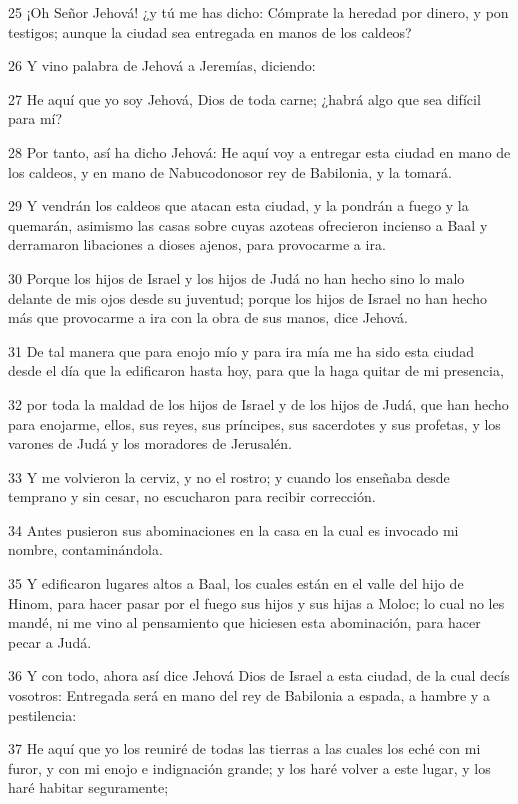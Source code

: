 \par 25 ¡Oh Señor Jehová! ¿y tú me has dicho: Cómprate la heredad por dinero, y pon testigos; aunque la ciudad sea entregada en manos de los caldeos?
\par 26 Y vino palabra de Jehová a Jeremías, diciendo:
\par 27 He aquí que yo soy Jehová, Dios de toda carne; ¿habrá algo que sea difícil para mí?
\par 28 Por tanto, así ha dicho Jehová: He aquí voy a entregar esta ciudad en mano de los caldeos, y en mano de Nabucodonosor rey de Babilonia, y la tomará. 
\par 29 Y vendrán los caldeos que atacan esta ciudad, y la pondrán a fuego y la quemarán, asimismo las casas sobre cuyas azoteas ofrecieron incienso a Baal y derramaron libaciones a dioses ajenos, para provocarme a ira.
\par 30 Porque los hijos de Israel y los hijos de Judá no han hecho sino lo malo delante de mis ojos desde su juventud; porque los hijos de Israel no han hecho más que provocarme a ira con la obra de sus manos, dice Jehová.
\par 31 De tal manera que para enojo mío y para ira mía me ha sido esta ciudad desde el día que la edificaron hasta hoy, para que la haga quitar de mi presencia,
\par 32 por toda la maldad de los hijos de Israel y de los hijos de Judá, que han hecho para enojarme, ellos, sus reyes, sus príncipes, sus sacerdotes y sus profetas, y los varones de Judá y los moradores de Jerusalén.
\par 33 Y me volvieron la cerviz, y no el rostro; y cuando los enseñaba desde temprano y sin cesar, no escucharon para recibir corrección.
\par 34 Antes pusieron sus abominaciones en la casa en la cual es invocado mi nombre, contaminándola. 
\par 35 Y edificaron lugares altos a Baal, los cuales están en el valle del hijo de Hinom, para hacer pasar por el fuego sus hijos y sus hijas a Moloc; lo cual no les mandé, ni me vino al pensamiento que hiciesen esta abominación, para hacer pecar a Judá.
\par 36 Y con todo, ahora así dice Jehová Dios de Israel a esta ciudad, de la cual decís vosotros: Entregada será en mano del rey de Babilonia a espada, a hambre y a pestilencia:
\par 37 He aquí que yo los reuniré de todas las tierras a las cuales los eché con mi furor, y con mi enojo e indignación grande; y los haré volver a este lugar, y los haré habitar seguramente;
